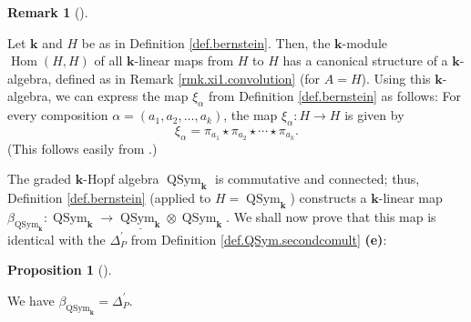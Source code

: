 \documentclass[numbers=enddot,12pt,final,onecolumn,notitlepage,abstracton]{scrartcl}%
\theoremstyle{definition}
\newtheorem{prop}[theo]{Proposition}
\newenvironment{proposition}[1][]
{\begin{prop}[#1]\begin{leftbar}}
{\end{leftbar}\end{prop}}
\newtheorem{remk}[theo]{Remark}
\newenvironment{remark}[1][]
{\begin{remk}[#1]\begin{leftbar}}
{\end{leftbar}\end{remk}}
\begin{document}

\begin{remark}
\label{rmk.xi2.convolution}Let $\mathbf{k}$ and $H$ be as in Definition
\ref{def.bernstein}. Then, the $\mathbf{k}$-module $\operatorname*{Hom}\left(
H,H\right)  $ of all $\mathbf{k}$-linear maps from $H$ to $H$ has a canonical
structure of a $\mathbf{k}$-algebra, defined as in Remark
\ref{rmk.xi1.convolution} (for $A=H$). Using this $\mathbf{k}$-algebra, we can
express the map $\xi_{\alpha}$ from Definition \ref{def.bernstein} as
follows: For every composition $\alpha=\left(  a_{1},a_{2},\ldots
,a_{k}\right)  $, the map $\xi_{\alpha}:H\rightarrow H$ is given by%
\[
\xi_{\alpha}=\pi_{a_{1}}\star\pi_{a_{2}}\star\cdots\star\pi_{a_{k}}.
\]
(This follows easily from \cite[Exercise 1.4.23]{Reiner}.)
\end{remark}

The graded $\mathbf{k}$-Hopf algebra $\operatorname*{QSym}%
\nolimits_{\mathbf{k}}$ is commutative and connected; thus, Definition
\ref{def.bernstein} (applied to $H=\operatorname*{QSym}\nolimits_{\mathbf{k}}%
$) constructs a $\mathbf{k}$-linear map $\beta_{\operatorname*{QSym}%
\nolimits_{\mathbf{k}}}:\operatorname*{QSym}\nolimits_{\mathbf{k}}%
\rightarrow\underline{\operatorname*{QSym}\nolimits_{\mathbf{k}}}%
\otimes\operatorname*{QSym}\nolimits_{\mathbf{k}}$. We shall now prove that
this map is identical with the $\Delta_{P}^{\prime}$ from Definition
\ref{def.QSym.secondcomult} \textbf{(e)}:

\begin{proposition}
\label{prop.QSym.secondcomult.alt}We have $\beta_{\operatorname*{QSym}%
\nolimits_{\mathbf{k}}}=\Delta_{P}^{\prime}$.
\end{proposition}
\end{document}
